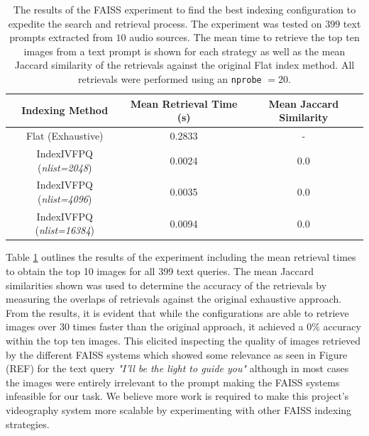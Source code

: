\documentclass{l4proj}
\begin{document}
\begin{table}
    \centering
    \begin{tabular}{|c|c|c|}
        \hline
        \textbf{Indexing Method} & \textbf{Mean Retrieval Time (s)} & \textbf{Mean Jaccard Similarity} \\
        \hline
        \hline
        Flat (Exhaustive) & 0.2833 & - \\
        \hline
        IndexIVFPQ (\emph{nlist=2048}) & 0.0024 & 0.0 \\
        \hline
        IndexIVFPQ (\emph{nlist=4096}) & 0.0035 & 0.0 \\
        \hline
        IndexIVFPQ (\emph{nlist=16384}) & 0.0094 & 0.0 \\
        \hline
    \end{tabular}
    
    \caption{ The results of the FAISS experiment to find the best indexing configuration to expedite the search and retrieval process. The experiment was tested on $399$ text prompts extracted from $10$ audio sources. The mean time to retrieve the top ten images from a text prompt is shown for each strategy as well as the mean Jaccard similarity of the retrievals against the original Flat index method. All retrievals were performed using an \lstinline|nprobe| $=20$.}
    \label{tab:faiss_experiment}
\end{table}

Table \ref{tab:faiss_experiment} outlines the results of the experiment including the mean retrieval times to obtain the top 10 images for all 399 text queries. The mean Jaccard similarities shown was used to determine the accuracy of the retrievals by measuring the overlaps of retrievals against the original exhaustive approach. From the results, it is evident that while the configurations are able to retrieve images over 30 times faster than the original approach, it achieved a 0\% accuracy within the top ten images. This elicited inspecting the quality of images retrieved by the different FAISS systems which showed some relevance as seen in Figure (REF) for the text query \emph{"I'll be the light to guide you"} although in most cases the images were entirely irrelevant to the prompt making the FAISS systems infeasible for our task. We believe more work is required to make this project's videography system more scalable by experimenting with other FAISS indexing strategies.
\end{document}
